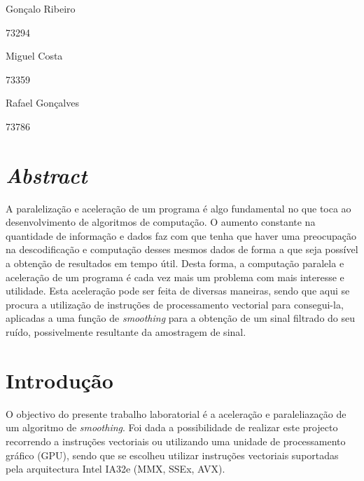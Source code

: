 \documentclass[a4paper]{article}
\begin{document}

	
	
	
	\trSetAuthors
	{
		\begin{center}
			Gonçalo Ribeiro

			73294
		\end{center}
	}{
		\begin{center}
			Miguel Costa

			73359
		\end{center}
	}{
		\begin{center}
			Rafael Gonçalves

			73786
		\end{center}
	}
		
	
	\trMakeCover
	
	\tableofcontents
	\pagebreak
	\setcounter{page}{1}
	
	\section{\textit{Abstract}}
	
	A paralelização e aceleração de um programa é algo fundamental no que toca ao desenvolvimento de algoritmos de computação. O aumento constante na quantidade de informação e dados faz com que tenha que haver uma preocupação na descodificação e computação desses mesmos dados de forma a que seja possível a obtenção de resultados em tempo útil. Desta forma, a computação paralela e aceleração de um programa é cada vez mais um problema com mais interesse e utilidade. Esta aceleração pode ser feita de diversas maneiras, sendo que aqui se procura a utilização de instruções de processamento vectorial para consegui-la, aplicadas a uma função de \textit{smoothing} para a obtenção de um sinal filtrado do seu ruído, possivelmente resultante da amostragem de sinal.
	
	
	\section{Introdução}
	
	O objectivo do presente trabalho laboratorial é a aceleração e paraleliazação de um algoritmo de \textit{smoothing}. Foi dada a possibilidade de realizar este projecto recorrendo a instruções vectoriais ou utilizando uma unidade de processamento gráfico (GPU), sendo que se escolheu utilizar instruções vectoriais suportadas pela arquitectura Intel IA32e (MMX, SSEx, AVX).
	
\end{document}
